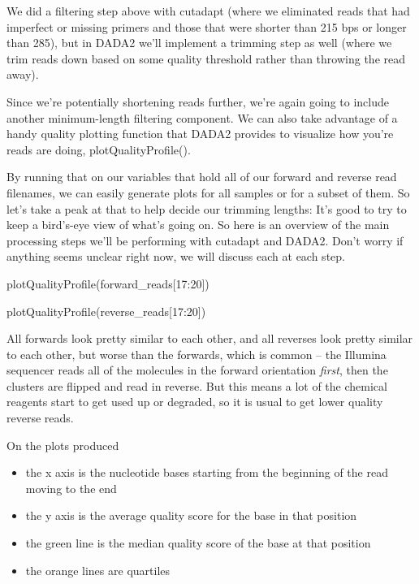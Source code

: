 \documentclass[
]{book}
\newenvironment{Shaded}{\begin{snugshade}}{\end{snugshade}}
\newcommand{\DecValTok}[1]{\textcolor[rgb]{0.00,0.00,0.81}{#1}}
\newcommand{\FunctionTok}[1]{\textcolor[rgb]{0.00,0.00,0.00}{#1}}
\newcommand{\NormalTok}[1]{#1}
\newcommand{\SpecialCharTok}[1]{\textcolor[rgb]{0.00,0.00,0.00}{#1}}
\begin{document}
We did a filtering step above with cutadapt (where we eliminated reads that had imperfect or missing primers and those that were shorter than 215 bps or longer than 285), but in DADA2 we'll implement a trimming step as well (where we trim reads down based on some quality threshold rather than throwing the read away).

Since we're potentially shortening reads further, we're again going to include another minimum-length filtering component. We can also take advantage of a handy quality plotting function that DADA2 provides to visualize how you're reads are doing, plotQualityProfile().

By running that on our variables that hold all of our forward and reverse read filenames, we can easily generate plots for all samples or for a subset of them. So let's take a peak at that to help decide our trimming lengths: It's good to try to keep a bird's-eye view of what's going on. So here is an overview of the main processing steps we'll be performing with cutadapt and DADA2. Don't worry if anything seems unclear right now, we will discuss each at each step.

\begin{Shaded}
\begin{Highlighting}[]
    \FunctionTok{plotQualityProfile}\NormalTok{(forward\_reads[}\DecValTok{17}\SpecialCharTok{:}\DecValTok{20}\NormalTok{])}

    \FunctionTok{plotQualityProfile}\NormalTok{(reverse\_reads[}\DecValTok{17}\SpecialCharTok{:}\DecValTok{20}\NormalTok{])}
\end{Highlighting}
\end{Shaded}

All forwards look pretty similar to each other, and all reverses look pretty similar to each other, but worse than the forwards, which is common --
the Illumina sequencer reads all of the molecules in the forward orientation \emph{first}, then the clusters are flipped and read in reverse. But this means a lot of the chemical reagents start to get used up or degraded, so it is usual to get lower quality reverse reads.

On the plots produced

\begin{itemize}
\item
  the x axis is the nucleotide bases starting from the beginning of the read moving to the end
\item
  the y axis is the average quality score for the base in that position
\item
  the green line is the median quality score of the base at that position
\item
  the orange lines are quartiles
\end{itemize}
\end{document}
